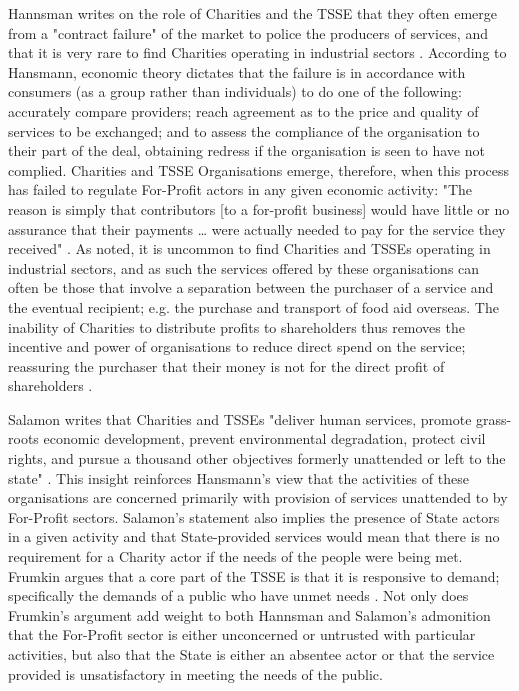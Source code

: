 Hannsman writes on the role of Charities and the TSSE that they often emerge from a "contract failure" of the market to police the producers of services, and that it is very rare to find Charities operating in industrial sectors \cite{hansmann_role_1980}. According to Hansmann, economic theory dictates that the failure is in accordance with consumers (as a group rather than individuals) to do one of the following: accurately compare providers; reach agreement  as to the price and quality of services to be exchanged; and to assess the compliance of the organisation to their part of the deal, obtaining redress if the organisation is seen to have not complied. Charities and TSSE Organisations emerge, therefore, when this process has failed to regulate For-Profit actors in any given economic activity: "The reason is simply that contributors [to a for-profit business] would  have little or no assurance that their payments … were actually needed to pay for the service they received" \cite{hansmann_role_1980}. As noted, it is uncommon to find Charities and TSSEs operating in industrial sectors, and as such the services offered by these organisations can often be those that involve a separation between the purchaser of a service and the eventual recipient; e.g. the purchase and transport of food aid overseas. The inability of Charities to distribute profits to shareholders thus removes the incentive and power of organisations to reduce direct spend on the service; reassuring the purchaser that their money is not for the direct profit of shareholders \cite{hansmann_role_1980}.

Salamon writes that Charities and TSSEs "deliver human services, promote grass-roots economic development, prevent environmental degradation, protect civil rights, and pursue a thousand other objectives formerly unattended or left to the state" \cite{salamon_search_1992-1}. This insight reinforces Hansmann's view that the activities of these organisations are concerned primarily with provision of services unattended to by For-Profit sectors. Salamon's statement also implies the presence of State actors in a given activity and that State-provided services would mean that there is no requirement for a Charity actor if the needs of the people were being met. Frumkin argues that a core part of the TSSE is that it is responsive to demand; specifically the demands of a public who have unmet needs \cite{frumkin_being_2009}. Not only does Frumkin's argument add weight to both Hannsman and Salamon's admonition that the For-Profit sector is either unconcerned or untrusted with particular activities, but also that the State is either an absentee actor or that the service provided is unsatisfactory in meeting the needs of the public.

